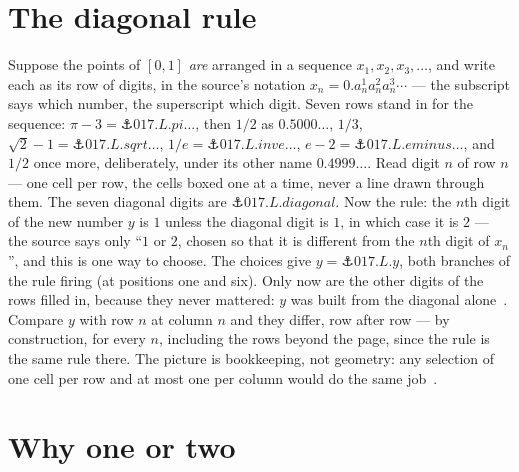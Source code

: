 \begin{narrative}
\section{The diagonal rule}

Suppose the points of $[0,1]$ \emph{are} arranged in a sequence $x_1,
x_2, x_3, \ldots$, and write each as its row of digits, in the source's
notation $x_n = 0.a_n^1 a_n^2 a_n^3 \cdots$ — the subscript says which
number, the superscript which digit. Seven rows stand in for the
sequence: $\pi - 3 = \anchor{017.L.pi}\ldots$, then $1/2$ as
$0.5000\ldots$, $1/3$, $\sqrt2 - 1 = \anchor{017.L.sqrt}\ldots$, $1/e =
\anchor{017.L.inve}\ldots$, $e - 2 = \anchor{017.L.eminus}\ldots$, and
$1/2$ once more, deliberately, under its other name $0.4999\ldots$.
Read digit $n$ of row $n$ — one cell per row, the cells boxed one at a
time, never a line drawn through them. The seven diagonal digits are
$\anchor{017.L.diagonal}$. Now the rule: the $n$th digit of the new
number $y$ is $1$ unless the diagonal digit is $1$, in which case it is
$2$ — the source says only ``$1$ or $2$, chosen so that it is different
from the $n$th digit of $x_n$'', and this is one way to choose. The
choices give $y = \anchor{017.L.y}$, both branches of the rule firing
(at positions one and six). Only now are the other digits of the rows
filled in, because they never mattered: $y$ was built from the diagonal
alone~\cite{probability-jason-filippou-a-better-number-sequence-to-present-cantor-s}.
Compare $y$ with row $n$ at column $n$ and they differ, row after row —
by construction, for every $n$, including the rows beyond the page,
since the rule is the same rule there. The picture is bookkeeping, not
geometry: any selection of one cell per row and at most one per column
would do the same
job~\cite{probability-jeremy-martin-cantor-s-diagonal-argument-math-410-kansas-200}.

\section{Why one or two}


\end{narrative}
